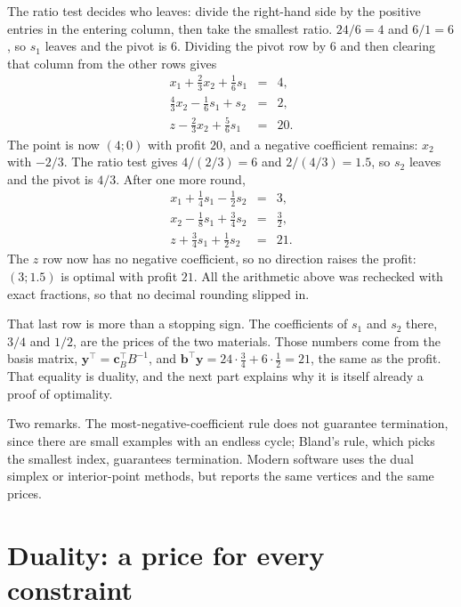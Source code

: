 The ratio test decides who leaves: divide the right-hand side by the positive entries in the
entering column, then take the smallest ratio. $24/6=4$ and $6/1=6$, so $s_{1}$ leaves and the
pivot is $6$. Dividing the pivot row by $6$ and then clearing that column from the other rows
gives
\[
  \begin{array}{rcl}
    x_{1}+\tfrac{2}{3}x_{2}+\tfrac{1}{6}s_{1} &=& 4,\\
    \tfrac{4}{3}x_{2}-\tfrac{1}{6}s_{1}+s_{2} &=& 2,\\
    z-\tfrac{2}{3}x_{2}+\tfrac{5}{6}s_{1} &=& 20 .
  \end{array}
\]
The point is now $(4;0)$ with profit $20$, and a negative coefficient remains: $x_{2}$ with
$-2/3$. The ratio test gives $4/(2/3)=6$ and $2/(4/3)=1.5$, so $s_{2}$ leaves and the pivot is
$4/3$. After one more round,
\[
  \begin{array}{rcl}
    x_{1}+\tfrac{1}{4}s_{1}-\tfrac{1}{2}s_{2} &=& 3,\\
    x_{2}-\tfrac{1}{8}s_{1}+\tfrac{3}{4}s_{2} &=& \tfrac{3}{2},\\
    z+\tfrac{3}{4}s_{1}+\tfrac{1}{2}s_{2} &=& 21 .
  \end{array}
\]
The $z$ row now has no negative coefficient, so no direction raises the profit:
$(3;1.5)$ is optimal with profit $21$. All the arithmetic above was rechecked with exact
fractions, so that no decimal rounding slipped in.

That last row is more than a stopping sign. The coefficients of $s_{1}$ and
$s_{2}$ there, $3/4$ and $1/2$, are the prices of the two materials. Those numbers come from the
basis matrix, $\mathbf{y}^{\top}=\mathbf{c}_{B}^{\top}B^{-1}$, and
$\mathbf{b}^{\top}\mathbf{y}=24\cdot\tfrac34+6\cdot\tfrac12=21$, the same as the profit.
That equality is duality, and the next part explains why it is itself already
a proof of optimality.

Two remarks. The most-negative-coefficient rule does not guarantee termination, since there are
small examples with an endless cycle; Bland's rule, which picks the smallest index, guarantees
termination. Modern software uses the dual simplex or interior-point methods, but reports the
same vertices and the same prices.

\section{Duality: a price for every constraint}

